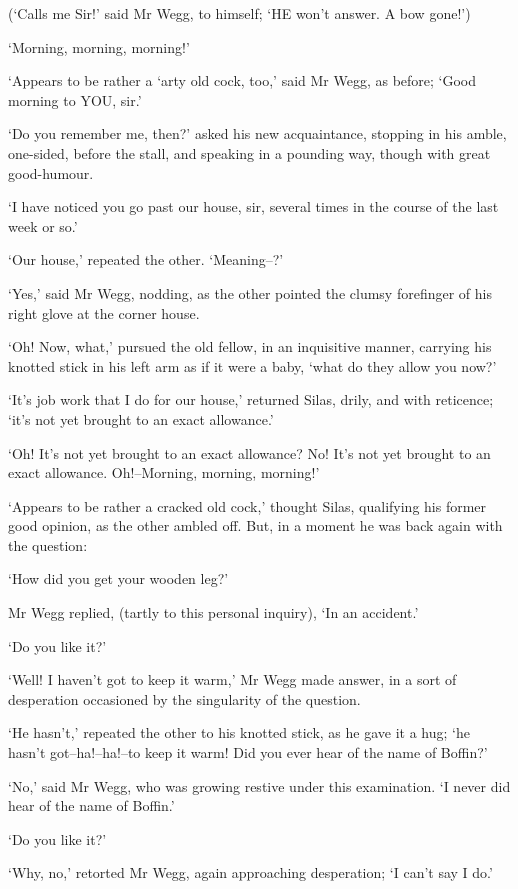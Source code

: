 (‘Calls me Sir!’ said Mr Wegg, to himself; ‘HE won’t answer. A bow
gone!’)

‘Morning, morning, morning!’

‘Appears to be rather a ‘arty old cock, too,’ said Mr Wegg, as before;
‘Good morning to YOU, sir.’

‘Do you remember me, then?’ asked his new acquaintance, stopping in
his amble, one-sided, before the stall, and speaking in a pounding way,
though with great good-humour.

‘I have noticed you go past our house, sir, several times in the course
of the last week or so.’

‘Our house,’ repeated the other. ‘Meaning--?’

‘Yes,’ said Mr Wegg, nodding, as the other pointed the clumsy forefinger
of his right glove at the corner house.

‘Oh! Now, what,’ pursued the old fellow, in an inquisitive manner,
carrying his knotted stick in his left arm as if it were a baby, ‘what
do they allow you now?’

‘It’s job work that I do for our house,’ returned Silas, drily, and with
reticence; ‘it’s not yet brought to an exact allowance.’

‘Oh! It’s not yet brought to an exact allowance? No! It’s not yet
brought to an exact allowance. Oh!--Morning, morning, morning!’

‘Appears to be rather a cracked old cock,’ thought Silas, qualifying his
former good opinion, as the other ambled off. But, in a moment he was
back again with the question:

‘How did you get your wooden leg?’

Mr Wegg replied, (tartly to this personal inquiry), ‘In an accident.’

‘Do you like it?’

‘Well! I haven’t got to keep it warm,’ Mr Wegg made answer, in a sort of
desperation occasioned by the singularity of the question.

‘He hasn’t,’ repeated the other to his knotted stick, as he gave it a
hug; ‘he hasn’t got--ha!--ha!--to keep it warm! Did you ever hear of the
name of Boffin?’

‘No,’ said Mr Wegg, who was growing restive under this examination. ‘I
never did hear of the name of Boffin.’

‘Do you like it?’

‘Why, no,’ retorted Mr Wegg, again approaching desperation; ‘I can’t say
I do.’

